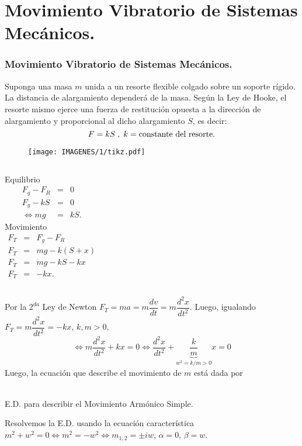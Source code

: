 \documentclass{beamer}
\begin{document}
\frame{\titlepage}

\section{Movimiento Vibratorio de Sistemas Mecánicos.} %
\begin{frame}[t]
	\frametitle{Movimiento Vibratorio de Sistemas Mecánicos.}
	\begin{block}{}
		Suponga una masa \(m\) unida a un resorte flexible colgado sobre un soporte rígido. La distancia de alargamiento dependerá de la masa. Según la Ley de Hooke, el resorte mismo ejerce una fuerza de restitución opuesta a la dirección de alargamiento y proporcional al dicho alargamiento \(S\), es decir: \vspace{-3mm}
		\[
			F=kS \;,\; k = \mbox{constante del resorte.} \vspace{-6mm}
		\]
		\begin{figure}[ht]
			\centering
			\texttt{[image: IMAGENES/1/tikz.pdf]}
		\end{figure}
	\end{block}
\end{frame}

\begin{frame}[t]
	\begin{block}{}
	\begin{columns}
		Equilibrio
		\[
			\begin{array}{rcl}
				F_g-F_R & = & 0 \\
				F_g-kS & = & 0 \\
				\iff mg & = & kS.
			\end{array}
		\]
		Movimiento
		\[
			\begin{array}{rcl}
				F_T & = & F_g-F_R \\
				F_T & = & mg - k(S+x) \\
				F_T & = & mg - kS-kx \\
				F_T & = & -kx.
			\end{array}
		\]
	\end{columns}
	\end{block}
\end{frame}

\begin{frame}[t]
	\begin{block}{}
		Por la \(2^{da}\) Ley de Newton \(F_T = ma = m \dfrac{dv}{dt} = m \dfrac{d^2x}{dt^2}\). Luego, igualando \(F_T = m \dfrac{d^2x}{dt^2} = -kx\), \(k,m >0\),
		\[
			\iff m \dfrac{d^2x}{dt^2} +kx =0 \iff \dfrac{d^2x}{dt^2} + \underbrace{\dfrac{k}{m}} _{w^2 = k/m >0}  x =0
		\]
		Luego, la ecuación que describe el movimiento de \(m\) está dada por
		\begin{center}
			\color{red}  \\
			\footnotesize E.D. para describir el Movimiento Armónico Simple.
		\end{center} 
		Resolvemos la E.D. usando la ecuación característica \(m^2+w^2=0 \iff m^2=-w^2 \iff m_{1,2} = \pm iw\), \(\alpha =0\), \(\beta =w\).
	\end{block}
\end{frame}
\end{document}
